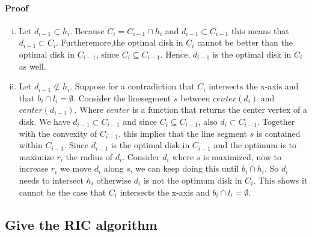 \documentclass{article}
\begin{document}
\paragraph{Proof}
\begin{enumerate}[(i)]
	\item Let $d_{i-1} \subset h_i$. Because $C_i = C_{i-1}\cap h_i$ and
		$d_{i-1} \subset C_{i-1}$ this means that $d_{i-1} \subset C_i$.
		Furtheremore,the optimal disk in $C_i$
		cannot be better than the optimal disk in $C_{i-1}$, since
		$C_i \subseteq C_{i-1}$. Hence, $d_{i-1}$ is the optimal disk
		in $C_i$ as well.
	\item Let $d_{i-1} \not\subset h_{i}$. Suppose for a contradiction that
		$C_i$ intersects the x-axis and that $b_i \cap l_i = \emptyset$.
		Consider the linesegment $s$ between $center(d_i)$ and 
		$center(d_{i-1})$.
		Where $center$ is a function that returns the center vertex of a disk.
		We have $d_{i-1} \subset C_{i-1}$ and
		since $C_i \subseteq C_{i-1}$, also $d_i \subset C_{i-1}$.
		Together with the convexity of $C_{i-1}$, this implies that
		the line segment $s$ is contained within $C_{i-1}$.
		Since $d_{i-1}$ is the optimal disk in $C_{i-1}$ and the optimum is to
		maximize $r_i$ the radius of $d_i$. Consider $d_i$
		where $s$ is maximized, now to increase $r_i$ we move $d_i$ along $s$,
		we can keep doing this until $b_i \cap h_i$.
		So $d_i$ needs to intersect $h_i$ otherwise $d_i$ is not the optimum
		disk in $C_i$. This shows it cannot be the case that $C_i$ intersects
		the x-axis and $b_i\cap l_i = \emptyset$.

\end{enumerate}
\subsection{Give the RIC algorithm}
\end{document}

